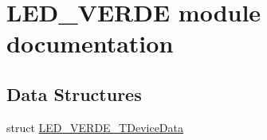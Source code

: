 \hypertarget{group___l_e_d___v_e_r_d_e__module}{}\section{L\+E\+D\+\_\+\+V\+E\+R\+DE module documentation}
\label{group___l_e_d___v_e_r_d_e__module}
\subsection*{Data Structures}
\begin{DoxyCompactItemize}
\item 
struct \hyperlink{struct_l_e_d___v_e_r_d_e___t_device_data}{L\+E\+D\+\_\+\+V\+E\+R\+D\+E\+\_\+\+T\+Device\+Data}
\end{DoxyCompactItemize}
